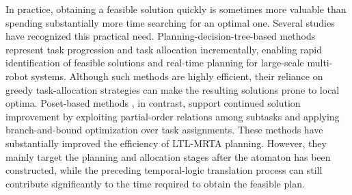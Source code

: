 \documentclass[lettersize,journal]{IEEEtran}
\theoremstyle{italiclemma}
\theoremstyle{italiclemma}
\theoremstyle{definition}
\begin{document}
In practice, obtaining a feasible solution quickly is sometimes more valuable than spending substantially more time searching for an optimal one. Several studies have recognized this practical need.
Planning-decision-tree-based methods\cite{Chen2024RealTimeReactive, 2025Task,10168225 } represent task progression and task allocation incrementally, enabling rapid identification of feasible solutions and real-time planning for large-scale multi-robot systems. Although such methods are highly efficient, their reliance on greedy task-allocation strategies can make the resulting solutions prone to local optima. Poset-based methods \cite{liu2024time}, in contrast, support continued solution improvement by exploiting partial-order relations among subtasks and applying branch-and-bound optimization over task assignments. These methods have substantially improved the efficiency of LTL-MRTA planning. However, they mainly target the planning and allocation stages after the atomaton has been constructed, while the preceding temporal-logic translation process can still contribute significantly to the time required to obtain the feasible plan.
\end{document}
